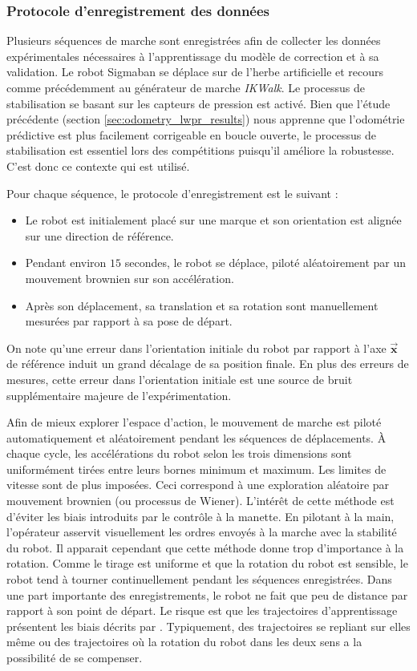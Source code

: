 \subsubsection{Protocole d'enregistrement des données}

Plusieurs séquences de marche sont enregistrées afin de collecter les données
expérimentales nécessaires à l'apprentissage du modèle de correction et à sa validation.
Le robot Sigmaban se déplace sur de l'herbe artificielle et recours comme précédemment 
au générateur de marche \textit{IKWalk}.
Le processus de stabilisation se basant sur les capteurs de pression est activé.
Bien que l'étude précédente (section \ref{sec:odometry_lwpr_results}) nous apprenne que 
l'odométrie prédictive est plus facilement corrigeable en boucle ouverte, le processus de stabilisation
est essentiel lors des compétitions puisqu'il améliore la robustesse. 
C'est donc ce contexte qui est utilisé.

Pour chaque séquence, le protocole d'enregistrement est le suivant :
\begin{itemize}
    \item Le robot est initialement placé sur une marque et son orientation 
        est alignée sur une direction de référence.
    \item Pendant environ $15$ secondes, le robot se déplace, piloté
        aléatoirement par un mouvement brownien sur son accélération.
    \item Après son déplacement, sa translation et sa rotation
        sont manuellement mesurées par rapport à sa pose de départ.\\
\end{itemize}
On note qu'une erreur dans l'orientation initiale du robot par rapport
à l'axe $\bm{\vec{x}}$ de référence induit un grand décalage de sa position finale.
En plus des erreurs de mesures, cette erreur dans l'orientation initiale est une
source de bruit supplémentaire majeure de l'expérimentation.

Afin de mieux explorer l'espace d'action, le mouvement de marche est 
piloté automatiquement et aléatoirement pendant les séquences de déplacements.
À chaque cycle, les accélérations du robot selon les trois dimensions sont uniformément tirées
entre leurs bornes minimum et maximum. Les limites de vitesse sont de plus imposées.
Ceci correspond à une exploration aléatoire par mouvement brownien (ou processus de Wiener).
L'intérêt de cette méthode est d'éviter les biais introduits par le contrôle à la manette.
En pilotant à la main, l'opérateur asservit visuellement les ordres envoyés à la marche
avec la stabilité du robot.
Il apparait cependant que cette méthode donne trop d'importance à la rotation.
Comme le tirage est uniforme et que la rotation du robot est sensible, 
le robot tend à tourner continuellement pendant les séquences enregistrées.
Dans une part importante des enregistrements, le robot ne fait que peu de distance 
par rapport à son point de départ.
Le risque est que les trajectoires d'apprentissage présentent les biais 
décrits par \cite{antonelli_calibration_2005}.
Typiquement, des trajectoires se repliant sur elles même ou des trajectoires où la rotation 
du robot dans les deux sens a la possibilité de se compenser.

